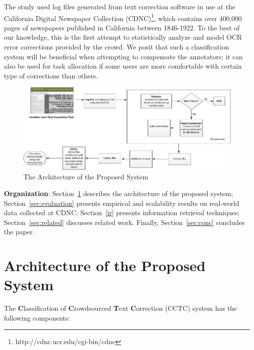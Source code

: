 \documentclass[10pt, conference, compsocconf]{IEEEtran}
\begin{document}
The study used log files generated from text correction software in use at the California Digital Newspaper Collection (CDNC)\footnote{http://cdnc.ucr.edu/cgi-bin/cdnc}, which contains over 400,000 pages of newspapers published in California between 1846-1922. 
To the best of our knowledge, this is the first attempt to statistically analyze and model OCR error corrections provided by the crowd. We posit that such a classification system will be beneficial when attempting to compensate the annotators; it can also be used for task allocation if some users are more comfortable with certain type of corrections than others.

\begin{figure}[t]
\centering
\includegraphics[width=0.8\textheight]{./image/archOCR.jpg}
\caption{The Architecture of the Proposed System}
\label{fig:arch}
\end{figure}

\noindent \textbf{Organization}: Section~\ref{arch} describes the architecture of the proposed system; Section~\ref{sec:evaluation} presents empirical and scalability results on real-world data collected at CDNC; Section~\ref{ir} presents information retrieval techniques; Section~\ref{sec:related} discusses related work. Finally, Section~\ref{sec:conc} concludes the paper.

\section{Architecture of the Proposed System}
\label{arch}
The \textbf{C}lassification of \textbf{C}rowdsourced \textbf{T}ext \textbf{C}orrection (CCTC) system has the following components:
\end{document}
